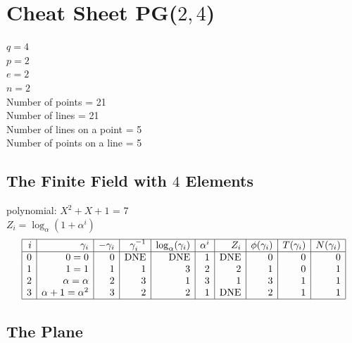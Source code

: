 
\section{Cheat Sheet PG($2,4$)}
\label{app:PG24}

{
\arraycolsep=2pt
\parindent=0pt
$q = 4$\\
$p = 2$\\
$e = 2$\\
$n = 2$\\
Number of points = 21\\
Number of lines = 21\\
Number of lines on a point = 5\\
Number of points on a line = 5\\

\subsection{The Finite Field with $4$ Elements}
polynomial: $X^{2} + X + 1$ = 7\\
$Z_i = \log_\alpha (1 + \alpha^i)$\\
$$\begin{array}{|*{10}{r|}}
\hline
i & \gamma_i & -\gamma_i& \gamma_i^{-1}& \log_\alpha(\gamma_i)& \alpha^i& Z_i& \phi(\gamma_i) & T(\gamma_i) & N(\gamma_i) \\
\hline
  0 & 0 = 0 &0 & \mbox{DNE} & \mbox{DNE} &1 & \mbox{DNE} &0 &0 &0\\
  1 &   1 = 1 &1 &1 &3 &2 &2 &1 &0 &1\\
  2 & \alpha = \alpha  &2 &3 &1 &3 &1 &3 &1 &1\\
  3 & \alpha +   1 = \alpha^{2} &3 &2 &2 &1 & \mbox{DNE} &2 &1 &1\\
\hline
\end{array}
$$

\subsection{The Plane}
$$

$$

}
